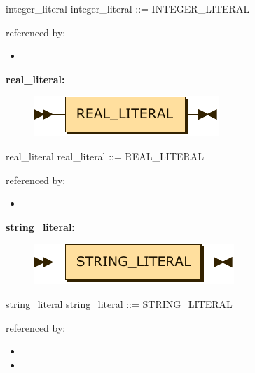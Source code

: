 \documentclass[10pt,a4paper,twoside]{article}
\providecommand{\tightlist}{%
  \setlength{\itemsep}{0pt}\setlength{\parskip}{0pt}}
\newcounter{grammarbox}[section]
\begin{document}
\begin{grammarbox}{integer\_literal}
\vspace{0.5em}
integer\_literal
         ::= INTEGER\_LITERAL
\end{grammarbox}

referenced by:

\begin{itemize}
\tightlist
\item
\end{itemize}

\textbf{real\_literal:}

\begin{figure}[H]
\centering
\includegraphics{diagram/real_literal.pdf}

\end{figure}

\begin{grammarbox}{real\_literal}
\vspace{0.5em}
real\_literal
         ::= REAL\_LITERAL
\end{grammarbox}

referenced by:

\begin{itemize}
\tightlist
\item
\end{itemize}

\textbf{string\_literal:}

\begin{figure}[H]
\centering
\includegraphics{diagram/string_literal.pdf}

\end{figure}

\begin{grammarbox}{string\_literal}
\vspace{0.5em}
string\_literal
         ::= STRING\_LITERAL
\end{grammarbox}

referenced by:

\begin{itemize}
\tightlist
\item
\item
\end{itemize}
\end{document}
